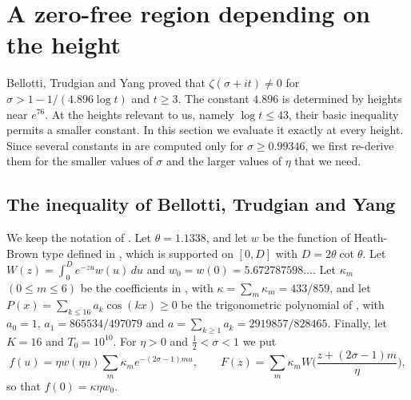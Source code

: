 \documentclass[11pt]{amsart}
\numberwithin{equation}{section}
\theoremstyle{definition}
\theoremstyle{remark}
\begin{document}
\section{A zero-free region depending on the height}\label{sec:zfr}

Bellotti, Trudgian and Yang \cite[Theorem~1]{BTY} proved that $\zeta(\sigma + it) \neq 0$ for $\sigma > 1 - 1/(4.896\log t)$ and $t \geq 3$.
The constant $4.896$ is determined by heights near $e^{76}$.
At the heights relevant to us, namely $\log t \leq 43$, their basic inequality permits a smaller constant.
In this section we evaluate it exactly at every height.
Since several constants in \cite{BTY} are computed only for $\sigma \geq 0.99346$, we first re-derive them for the smaller values of $\sigma$ and the larger values of $\eta$ that we need.

\subsection{The inequality of Bellotti, Trudgian and Yang}

We keep the notation of \cite{BTY}.
Let $\theta = 1.1338$, and let $w$ be the function of Heath-Brown type defined in \cite[Definition~1]{BTY}, which is supported on $[0,D]$ with $D = 2\theta\cot\theta$.
Let $W(z) = \int_0^De^{-zu}w(u)\,du$ and $w_0 = w(0) = 5.672787598\ldots$.
Let $\kappa_m$ $(0 \leq m \leq 6)$ be the coefficients in \cite[(18)]{BTY}, with $\kappa = \sum_m\kappa_m = 433/859$, and let $P(x) = \sum_{k\leq16}a_k\cos(kx) \geq 0$ be the trigonometric polynomial of \cite[Section~4]{BTY}, with $a_0 = 1$, $a_1 = 865534/497079$ and $a = \sum_{k\geq1}a_k = 2919857/828465$.
Finally, let $K = 16$ and $T_0 = 10^{10}$.
For $\eta > 0$ and $\frac12 < \sigma < 1$ we put
\[
f(u) = \eta w(\eta u)\sum_m\kappa_me^{-(2\sigma-1)mu}, \qquad F(z) = \sum_m\kappa_mW\Big(\frac{z + (2\sigma - 1)m}{\eta}\Big),
\]
so that $f(0) = \kappa\eta w_0$.
\end{document}
